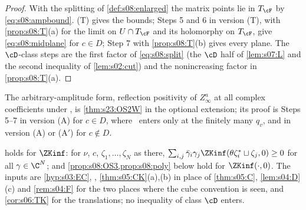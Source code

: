 \begin{proof}
With the splitting of \cref{def:s08:enlarged} the matrix points lie in $T_\cF$ by \eqref{eq:s08:ampbound}. (T) gives the bounds; Steps 5 and 6 in version (T), with \cref{prop:s08:T}(a) for the limit on $U\cap T_\cF$ and its holomorphy on $T_\cF$, give \eqref{eq:s08:midplane} for $c\in D$; Step 7 with \cref{prop:s08:T}(b) gives every plane. The $\cD$-class steps are the first factor of \eqref{eq:s08:split} (the $\cD$ half of \cref{lem:s07:L} and the second inequality of \cref{lem:s02:cut}) and the nonincreasing factor in \cref{prop:s08:T}(a).
\end{proof}

The arbitrary-amplitude form, reflection positivity of $Z^a_\infty$ at all complex coefficients under \Wtwo, is \cref{thm:s23:OS2W} in the optional extension; its proof is Steps 5--7 in version (A) for $c\in D$, where \Wtwo\ enters only at the finitely many $q_v$, and in version (A) or (A$'$) for $c\notin D$.

\begin{lemma}\label{lem:s08:OS2K}
 holds for $\ZKinf$: for $\nu$, $c$, $\zeta_1,\dots,\zeta_N$ as there, $\sum_{i,j}\bar\gamma_i\gamma_j\ZKinf(\theta\zeta_i^*\sqcup\zeta_j,0)\ge0$ for all $\gamma\in\C^N$; and \cref{prop:s08:OS3,prop:s08:poly} below hold for $\ZKinf(\cdot,0)$. The inputs are \cref{hyp:s03:EC}, \cite[Thm.~6.2(1),(2)]{BFS1}, \cref{thm:s05:CK}(a),(b) in place of \cref{thm:s05:C}, \cref{lem:s04:D}(c) and \cref{rem:s04:F} for the two places where the cube convention is seen, and \cref{cor:s06:TK} for the translations; no inequality of class $\cD$ enters.
\end{lemma}

